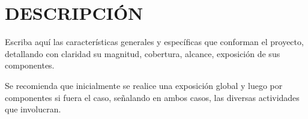 \section*{DESCRIPCIÓN}
\justifying
Escriba aquí las características generales y específicas que conforman el proyecto, detallando con claridad su magnitud, cobertura, alcance, exposición de sus componentes.

Se recomienda que inicialmente se realice una exposición global y luego por componentes si fuera el caso, señalando en ambos casos, las diversas actividades que involucran.